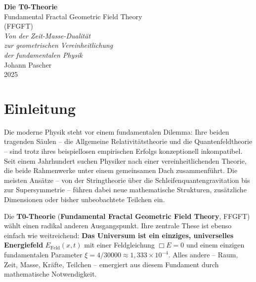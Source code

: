 \documentclass[11pt,openright,twoside]{book}
\begin{document}
\frontmatter
\pagestyle{fancy}
\makeatletter
\let\ps@plain\ps@fancy
\let\ps@empty\ps@fancy
\makeatother

\begin{titlepage}
	\centering
	\vspace*{2cm}
	
	{\Huge\bfseries Die T0-Theorie}\\[0.8cm]
	{\LARGE Fundamental Fractal Geometric Field Theory}\\[0.5cm]
	{\LARGE (FFGFT)}\\[1.5cm]
	
	{\Large\itshape Von der Zeit-Masse-Dualität\\[0.3cm]
		zur geometrischen Vereinheitlichung\\[0.3cm]
		der fundamentalen Physik}\\[2cm]
	
	{\large Johann Pascher}\\[1cm]
	
	{\large 2025}
	
	\vfill
\end{titlepage}

\chapter*{Einleitung}

Die moderne Physik steht vor einem fundamentalen Dilemma: Ihre beiden tragenden Säulen -- die Allgemeine Relativitätstheorie und die Quantenfeldtheorie -- sind trotz ihres beispiellosen empirischen Erfolgs konzeptionell inkompatibel. Seit einem Jahrhundert suchen Physiker nach einer vereinheitlichenden Theorie, die beide Rahmenwerke unter einem gemeinsamen Dach zusammenführt. Die meisten Ansätze -- von der Stringtheorie über die Schleifenquantengravitation bis zur Supersymmetrie -- führen dabei neue mathematische Strukturen, zusätzliche Dimensionen oder bisher unbeobachtete Teilchen ein.

Die \textbf{T0-Theorie} (\textbf{Fundamental Fractal Geometric Field Theory}, FFGFT) wählt einen radikal anderen Ausgangspunkt. Ihre zentrale These ist ebenso einfach wie weitreichend: \textbf{Das Universum ist ein einziges, universelles Energiefeld} $E_{\text{Feld}}(x,t)$ mit einer Feldgleichung $\Box E = 0$ und einem einzigen fundamentalen Parameter $\xi = 4/30000 \approx 1{,}333 \times 10^{-4}$. Alles andere -- Raum, Zeit, Masse, Kräfte, Teilchen -- emergiert aus diesem Fundament durch mathematische Notwendigkeit.
\end{document}
